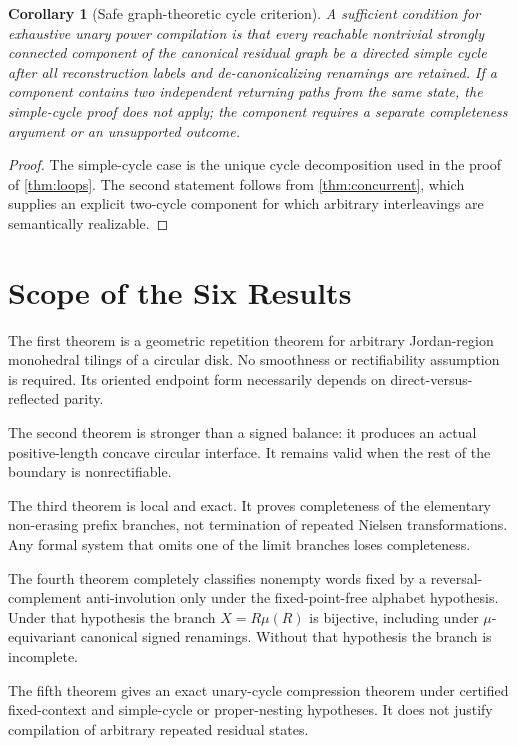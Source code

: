 \documentclass[11pt]{article}
\newtheorem{corollary}[theorem]{Corollary}
\begin{document}
\begin{corollary}[Safe graph-theoretic cycle criterion]\label{cor:safe-scc}
A sufficient condition for exhaustive unary power compilation is that every reachable nontrivial strongly connected component of the canonical residual graph be a directed simple cycle after all reconstruction labels and de-canonicalizing renamings are retained. If a component contains two independent returning paths from the same state, the simple-cycle proof does not apply; the component requires a separate completeness argument or an unsupported outcome.
\end{corollary}

\begin{proof}
The simple-cycle case is the unique cycle decomposition used in the proof of \cref{thm:loops}. The second statement follows from \cref{thm:concurrent}, which supplies an explicit two-cycle component for which arbitrary interleavings are semantically realizable.
\end{proof}

\section{Scope of the Six Results}

The first theorem is a geometric repetition theorem for arbitrary Jordan-region monohedral tilings of a circular disk. No smoothness or rectifiability assumption is required. Its oriented endpoint form necessarily depends on direct-versus-reflected parity.

The second theorem is stronger than a signed balance: it produces an actual positive-length concave circular interface. It remains valid when the rest of the boundary is nonrectifiable.

The third theorem is local and exact. It proves completeness of the elementary non-erasing prefix branches, not termination of repeated Nielsen transformations. Any formal system that omits one of the limit branches loses completeness.

The fourth theorem completely classifies nonempty words fixed by a reversal-complement anti-involution only under the fixed-point-free alphabet hypothesis. Under that hypothesis the branch $X=R\mu(R)$ is bijective, including under $\mu$-equivariant canonical signed renamings. Without that hypothesis the branch is incomplete.

The fifth theorem gives an exact unary-cycle compression theorem under certified fixed-context and simple-cycle or proper-nesting hypotheses. It does not justify compilation of arbitrary repeated residual states.
\end{document}
